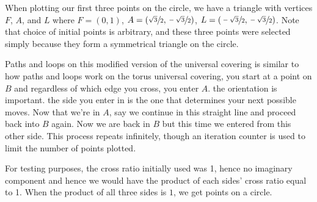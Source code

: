 \documentclass[12pt,a4paper,reqno,parskip=full]{amsart}
\numberwithin{equation}{section}
\theoremstyle{plain}
\theoremstyle{definition}
\begin{document}
When plotting our first three points on the circle, we have a triangle with vertices $F$, $A$, and $L$ where
{$F=(0,1)$, $A=\left(\sfrac{\sqrt3}{2},\sfrac{-\sqrt3}{2}\right)$, $L=\left(\sfrac{-\sqrt3}{2},\sfrac{-\sqrt3}{2}\right)$}. Note that choice of initial points is arbitrary, and these three points were selected simply because they form a symmetrical triangle on the circle.

Paths and loops on this modified version of the universal covering is similar to how paths and loops work on the torus universal covering, you start at a point on $B$ and regardless of which edge you cross, you enter $A$. the orientation is important. the side you enter in is the one that determines your next possible moves. Now that we're in $A$, say we continue in this straight line and proceed back into $B$ again. Now we are back in $B$ but this time we entered from this other side. This process repeats infinitely, though an iteration counter is used to limit the number of points plotted.

For testing purposes, the cross ratio initially used was 1, hence no imaginary component and hence we would have the product of each sides' cross ratio equal to 1. When the product of all three sides is $1$, we get points on a circle.





\end{document}

